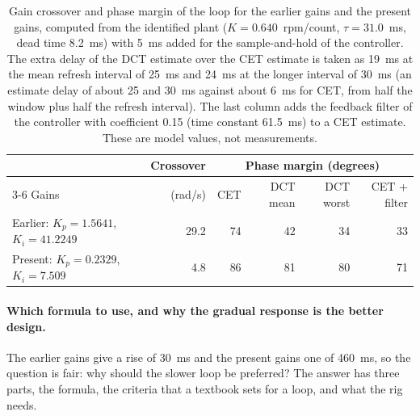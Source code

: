 \begin{table}[htbp]
    \centering
    \caption[Gain crossover and phase margin of the two sets of gains]{Gain crossover and phase margin of the loop for the earlier gains and the present gains, computed from the identified plant ($K = 0.640$~rpm/count, $\tau = 31.0$~ms, dead time 8.2~ms) with 5~ms added for the sample-and-hold of the controller. The extra delay of the DCT estimate over the CET estimate is taken as 19~ms at the mean refresh interval of 25~ms and 24~ms at the longer interval of 30~ms (an estimate delay of about 25 and 30~ms against about 6~ms for CET, from half the window plus half the refresh interval). The last column adds the feedback filter of the controller with coefficient 0.15 (time constant 61.5~ms) to a CET estimate. These are model values, not measurements.}
    \label{tab:margins}
    \small
    \begin{tabular}{@{}lrrrrr@{}}
        \toprule
        & Crossover & \multicolumn{4}{c}{Phase margin (degrees)} \\
        \cmidrule(lr){3-6}
        Gains & (rad/s) & CET & DCT mean & DCT worst & CET + filter \\
        \midrule
        Earlier: $K_p = 1.5641$, $K_i = 41.2249$ & 29.2 & 74 & 42 & 34 & 33 \\
        Present: $K_p = 0.2329$, $K_i = 7.509$ & 4.8 & 86 & 81 & 80 & 71 \\
        \bottomrule
    \end{tabular}
\end{table}

\paragraph{Which formula to use, and why the gradual response is the better design.}
The earlier gains give a rise of 30~ms and the present gains one of 460~ms, so the question is fair: why should the slower loop be preferred? The answer has three parts, the formula, the criteria that a textbook sets for a loop, and what the rig needs.

